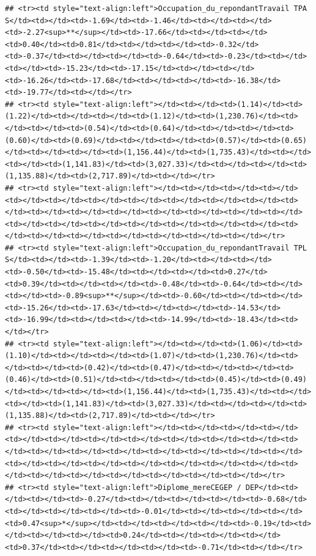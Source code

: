 \documentclass[
]{article}
\begin{document}
\begin{verbatim}
## <tr><td style="text-align:left">Occupation_du_repondantTravail TPA S</td><td></td><td>-1.69</td><td>-1.46</td><td></td><td></td><td>-2.27<sup>**</sup></td><td>-17.66</td><td></td><td></td><td>0.40</td><td>0.81</td><td></td><td></td><td>-0.32</td><td>-0.37</td><td></td><td></td><td>-0.64</td><td>-0.23</td><td></td><td></td><td>-15.23</td><td>-17.15</td><td></td><td></td><td>-16.26</td><td>-17.68</td><td></td><td></td><td>-16.38</td><td>-19.77</td><td></td></tr>
## <tr><td style="text-align:left"></td><td></td><td>(1.14)</td><td>(1.22)</td><td></td><td></td><td>(1.12)</td><td>(1,230.76)</td><td></td><td></td><td>(0.54)</td><td>(0.64)</td><td></td><td></td><td>(0.60)</td><td>(0.69)</td><td></td><td></td><td>(0.57)</td><td>(0.65)</td><td></td><td></td><td>(1,156.44)</td><td>(1,735.43)</td><td></td><td></td><td>(1,141.83)</td><td>(3,027.33)</td><td></td><td></td><td>(1,135.88)</td><td>(2,717.89)</td><td></td></tr>
## <tr><td style="text-align:left"></td><td></td><td></td><td></td><td></td><td></td><td></td><td></td><td></td><td></td><td></td><td></td><td></td><td></td><td></td><td></td><td></td><td></td><td></td><td></td><td></td><td></td><td></td><td></td><td></td><td></td><td></td><td></td><td></td><td></td><td></td><td></td><td></td></tr>
## <tr><td style="text-align:left">Occupation_du_repondantTravail TPL S</td><td></td><td>-1.39</td><td>-1.20</td><td></td><td></td><td>-0.50</td><td>-15.48</td><td></td><td></td><td>0.27</td><td>0.39</td><td></td><td></td><td>-0.48</td><td>-0.64</td><td></td><td></td><td>-0.89<sup>**</sup></td><td>-0.60</td><td></td><td></td><td>-15.26</td><td>-17.63</td><td></td><td></td><td>-14.53</td><td>-16.99</td><td></td><td></td><td>-14.99</td><td>-18.43</td><td></td></tr>
## <tr><td style="text-align:left"></td><td></td><td>(1.06)</td><td>(1.10)</td><td></td><td></td><td>(1.07)</td><td>(1,230.76)</td><td></td><td></td><td>(0.42)</td><td>(0.47)</td><td></td><td></td><td>(0.46)</td><td>(0.51)</td><td></td><td></td><td>(0.45)</td><td>(0.49)</td><td></td><td></td><td>(1,156.44)</td><td>(1,735.43)</td><td></td><td></td><td>(1,141.83)</td><td>(3,027.33)</td><td></td><td></td><td>(1,135.88)</td><td>(2,717.89)</td><td></td></tr>
## <tr><td style="text-align:left"></td><td></td><td></td><td></td><td></td><td></td><td></td><td></td><td></td><td></td><td></td><td></td><td></td><td></td><td></td><td></td><td></td><td></td><td></td><td></td><td></td><td></td><td></td><td></td><td></td><td></td><td></td><td></td><td></td><td></td><td></td><td></td><td></td></tr>
## <tr><td style="text-align:left">Diplome_mereCEGEP / DEP</td><td></td><td></td><td>-0.27</td><td></td><td></td><td></td><td>-0.68</td><td></td><td></td><td></td><td>-0.01</td><td></td><td></td><td></td><td>0.47<sup>*</sup></td><td></td><td></td><td></td><td>-0.19</td><td></td><td></td><td></td><td>0.24</td><td></td><td></td><td></td><td>0.37</td><td></td><td></td><td></td><td>-0.71</td><td></td></tr>

\end{verbatim}
\end{document}
